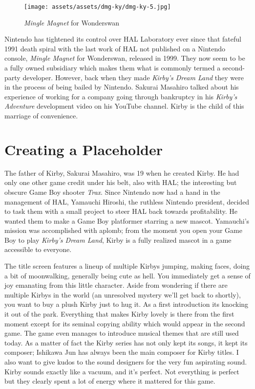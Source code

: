\documentclass{book}
\begin{document}
\begin{figure}[hbt]
\vskip 10pt
\centering \texttt{[image: assets/assets/dmg-ky/dmg-ky-5.jpg]}\par\pagetwodescription \emph{Mingle Magnet} for Wonderswan
\vskip 6pt
\end{figure}

Nintendo has tightened its control over HAL Laboratory ever since that fateful 1991 death spiral with the last work of HAL not published on a Nintendo console, \emph{Mingle Magnet} for Wonderswan, released in 1999. They now seem to be a fully owned subsidiary which makes them what is commonly termed a second-party developer. However, back when they made \emph{Kirby’s Dream Land} they were in the process of being bailed by Nintendo. Sakurai Masahiro talked about his experience of working for a company going through bankruptcy in his \emph{Kirby’s Adventure} development video on his YouTube channel. Kirby is the child of this marriage of convenience.

\FloatBarrier\needspace{5pt}\section*{Creating a Placeholder}\nopagebreak[4]

The father of Kirby, Sakurai Masahiro, was 19 when he created Kirby. He had only one other game credit under his belt, also with HAL; the interesting but obscure Game Boy shooter \emph{Trax}. Since Nintendo now had a hand in the management of HAL, Yamauchi Hiroshi, the ruthless Nintendo president, decided to task them with a small project to steer HAL back towards profitability. He wanted them to make a Game Boy platformer starring a new mascot. Yamauchi’s mission was accomplished with aplomb; from the moment you open your Game Boy to play \emph{Kirby’s Dream Land}, Kirby is a fully realized mascot in a game accessible to everyone.

The title screen features a lineup of multiple Kirbys jumping, making faces, doing a bit of moonwalking, generally being cute as hell. You immediately get a sense of joy emanating from this little character. Aside from wondering if there are multiple Kirbys in the world (an unresolved mystery we’ll get back to shortly), you want to buy a plush Kirby just to hug it. As a first introduction its knocking it out of the park. Everything that makes Kirby lovely is there from the first moment except for its seminal copying ability which would appear in the second game. The game even manages to introduce musical themes that are still used today. As a matter of fact the Kirby series has not only kept its songs, it kept its composer; Ishikawa Jun has always been the main composer for Kirby titles. I also want to give kudos to the sound designers for the very fun aspirating sound. Kirby sounds exactly like a vacuum, and it’s perfect. Not everything is perfect but they clearly spent a lot of energy where it mattered for this game.
\end{document}
